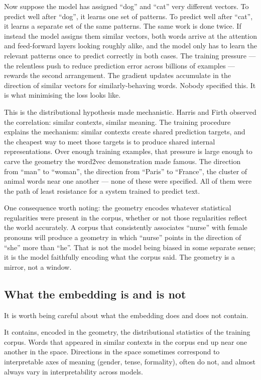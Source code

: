 Now suppose the model has assigned ``dog'' and ``cat'' very
different vectors. To predict well after ``dog'', it learns one
set of patterns. To predict well after ``cat'', it learns a
separate set of the same patterns. The same work is done twice.
If instead the model assigns them similar vectors, both words
arrive at the attention and feed-forward layers looking roughly
alike, and the model only has to learn the relevant patterns
once to predict correctly in both cases. The training
pressure --- the relentless push to reduce prediction error
across billions of examples --- rewards the second arrangement.
The gradient updates accumulate in the direction of similar
vectors for similarly-behaving words. Nobody specified this.
It is what minimising the loss looks like.

This is the distributional hypothesis made mechanistic. Harris
and Firth observed the correlation: similar contexts, similar
meaning. The training procedure explains the mechanism: similar
contexts create shared prediction targets, and the cheapest way
to meet those targets is to produce shared internal
representations. Over enough training examples, that
pressure is large enough to carve the geometry the word2vec
demonstration made famous. The direction from ``man'' to
``woman'', the direction from ``Paris'' to ``France'', the
cluster of animal words near one another --- none of these were
specified. All of them were the path of least resistance for a
system trained to predict text.

One consequence worth noting: the geometry encodes whatever
statistical regularities were present in the corpus, whether
or not those regularities reflect the world accurately. A corpus
that consistently associates ``nurse'' with female pronouns will
produce a geometry in which ``nurse'' points in the direction
of ``she'' more than ``he''. That is not the model being biased
in some separate sense; it is the model faithfully encoding what
the corpus said. The geometry is a mirror, not a window.

\subsection*{What the embedding is and is not}

It is worth being careful about what the embedding does and
does not contain.

It contains, encoded in the geometry, the distributional
statistics of the training corpus. Words that appeared in
similar contexts in the corpus end up near one another in the
space. Directions in the space sometimes correspond to
interpretable axes of meaning (gender, tense, formality), often
do not, and almost always vary in interpretability across
models.

